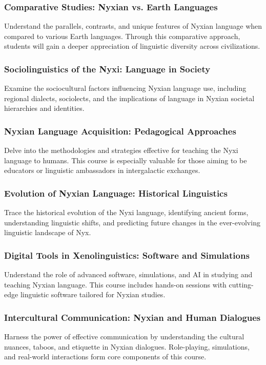 \subsubsection{Comparative Studies: Nyxian vs. Earth Languages}
Understand the parallels, contrasts, and unique features of Nyxian language when compared to various Earth languages. Through this comparative approach, students will gain a deeper appreciation of linguistic diversity across civilizations.
\subsubsection{Sociolinguistics of the Nyxi: Language in Society}
Examine the sociocultural factors influencing Nyxian language use, including regional dialects, sociolects, and the implications of language in Nyxian societal hierarchies and identities.
\subsubsection{Nyxian Language Acquisition: Pedagogical Approaches}
Delve into the methodologies and strategies effective for teaching the Nyxi language to humans. This course is especially valuable for those aiming to be educators or linguistic ambassadors in intergalactic exchanges.
\subsubsection{Evolution of Nyxian Language: Historical Linguistics}
Trace the historical evolution of the Nyxi language, identifying ancient forms, understanding linguistic shifts, and predicting future changes in the ever-evolving linguistic landscape of Nyx.
\subsubsection{Digital Tools in Xenolinguistics: Software and Simulations}
Understand the role of advanced software, simulations, and AI in studying and teaching Nyxian language. This course includes hands-on sessions with cutting-edge linguistic software tailored for Nyxian studies.
\subsubsection{Intercultural Communication: Nyxian and Human Dialogues}
Harness the power of effective communication by understanding the cultural nuances, taboos, and etiquette in Nyxian dialogues. Role-playing, simulations, and real-world interactions form core components of this course.
